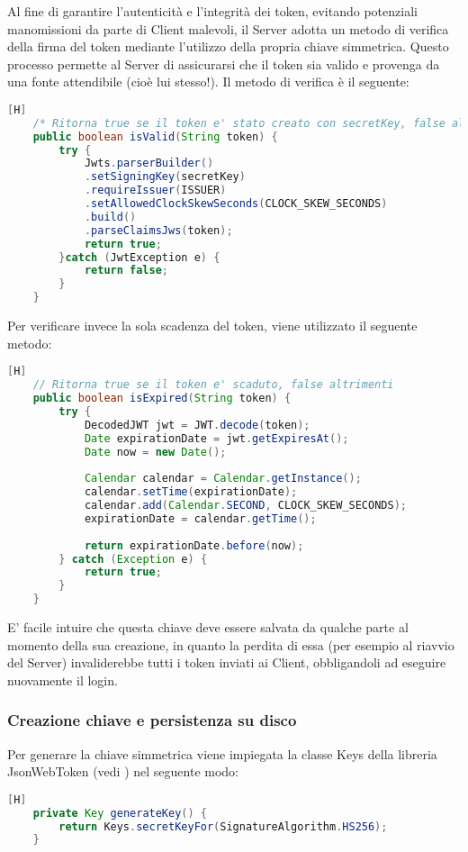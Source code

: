 Al fine di garantire l'autenticità e l'integrità dei token, evitando potenziali manomissioni da parte di Client malevoli, il Server adotta un metodo di verifica della firma del token mediante l'utilizzo della propria chiave simmetrica. Questo processo permette al Server di assicurarsi che il token sia valido e provenga da una fonte attendibile (cioè lui stesso!). Il metodo di verifica è il seguente:
\begin{lstlisting}[language=Java][H]
	/* Ritorna true se il token e' stato creato con secretKey, false altrimenti */
	public boolean isValid(String token) {
		try {
			Jwts.parserBuilder()
			.setSigningKey(secretKey)
			.requireIssuer(ISSUER)
			.setAllowedClockSkewSeconds(CLOCK_SKEW_SECONDS)
			.build()
			.parseClaimsJws(token);
			return true;
		}catch (JwtException e) {
			return false;
		}
	}
\end{lstlisting}

\noindent
Per verificare invece la sola scadenza del token, viene utilizzato il seguente metodo:
\begin{lstlisting}[language=Java][H]
	// Ritorna true se il token e' scaduto, false altrimenti
	public boolean isExpired(String token) {
		try {
			DecodedJWT jwt = JWT.decode(token);
			Date expirationDate = jwt.getExpiresAt();
			Date now = new Date();
			
			Calendar calendar = Calendar.getInstance();
			calendar.setTime(expirationDate);
			calendar.add(Calendar.SECOND, CLOCK_SKEW_SECONDS);
			expirationDate = calendar.getTime();
			
			return expirationDate.before(now);
		} catch (Exception e) {
			return true;
		}
	}
\end{lstlisting}

\noindent
E' facile intuire che questa chiave deve essere salvata da qualche parte al momento della sua creazione, in quanto la perdita di essa (per esempio al riavvio del Server) invaliderebbe tutti i token inviati ai Client, obbligandoli ad eseguire nuovamente il login.

\subsubsection{Creazione chiave e persistenza su disco} \label{subsub:key_creation_and_disk_persistency}
Per generare la chiave simmetrica viene impiegata la classe Keys della libreria JsonWebToken (vedi ) nel seguente modo:
\begin{lstlisting}[language=Java, firstnumber=1][H]
	private Key generateKey() {
		return Keys.secretKeyFor(SignatureAlgorithm.HS256);
	}
\end{lstlisting}


